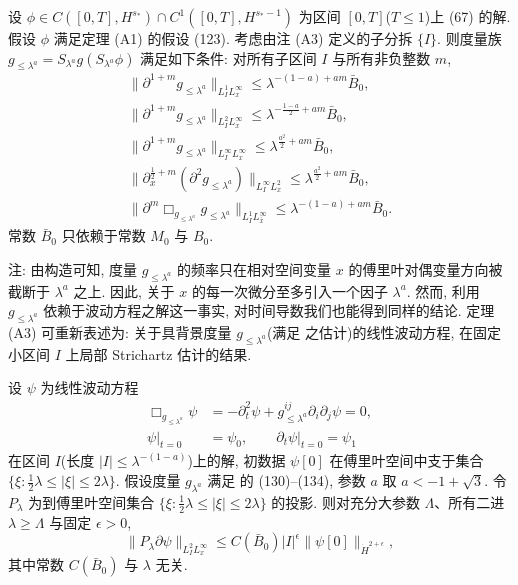 \begin{proposition}\label{prop:6.14}
设 $\phi\in C([0,T],H^{s_*})\cap C^1([0,T],H^{s_*-1})$ 为区间 $[0,T]$($T\leq 1$)上 (67) 的解. 假设 $\phi$ 满足定理 (A1) 的假设 (123). 考虑由注 (A3) 定义的子分拆 $\{I\}$. 则度量族 $g_{\leq\lambda^a}=S_{\lambda^a}g(S_{\lambda^a}\phi)$ 满足如下条件:
对所有子区间 $I$ 与所有非负整数 $m$,
\begin{gather}
\|\partial^{1+m}g_{\leq\lambda^a}\|_{L_I^1L_x^\infty}\leq\lambda^{-(1-a)+am}\bar B_0,\\
\|\partial^{1+m}g_{\leq\lambda^a}\|_{L_I^2L_x^\infty}\leq\lambda^{-\frac{1-a}{2}+am}\bar B_0,\\
\|\partial^{1+m}g_{\leq\lambda^a}\|_{L_I^\infty L_x^\infty}\leq\lambda^{\frac{a^2}{2}+am}\bar B_0,\\
\|\partial_x^{\frac12+m}(\partial^2 g_{\leq\lambda^a})\|_{L_I^\infty L_x^2}\leq\lambda^{\frac{a^2}{2}+am}\bar B_0,\\
\|\partial^m\Box_{g_{\leq\lambda^a}}g_{\leq\lambda^a}\|_{L_I^1L_{\bar x}^\infty}\leq\lambda^{-(1-a)+am}\bar B_0.\end{gather}
常数 $\bar B_0$ 只依赖于常数 $M_0$ 与 $B_0$.\end{proposition}

注: 由构造可知, 度量 $g_{\leq\lambda^a}$ 的频率只在相对空间变量 $x$ 的傅里叶对偶变量方向被截断于 $\lambda^a$ 之上. 因此, 关于 $x$ 的每一次微分至多引入一个因子 $\lambda^a$. 然而, 利用 $g_{\leq\lambda^a}$ 依赖于波动方程之解这一事实, 对时间导数我们也能得到同样的结论.
定理 (A3) 可重新表述为: 关于具背景度量 $g_{\leq\lambda^a}$(满足 之估计)的线性波动方程, 在固定小区间 $I$ 上局部 Strichartz 估计的结果.
\begin{theorem}[A4]\label{thm:6.15}
设 $\psi$ 为线性波动方程
\begin{equation}
\begin{aligned}
\Box_{g_{\leq\lambda^a}}\psi&=-\partial_t^2\psi+g_{\leq\lambda^a}^{ij}\partial_i\partial_j\psi=0,\\
\psi|_{t=0}&=\psi_0,\qquad \partial_t\psi|_{t=0}=\psi_1
\end{aligned}
\end{equation}
在区间 $I$(长度 $|I|\leq\lambda^{-(1-a)}$)上的解, 初数据 $\psi[0]$ 在傅里叶空间中支于集合 $\{\xi:\frac12\lambda\leq|\xi|\leq 2\lambda\}$. 假设度量 $g_{\lambda^a}$ 满足 的 (130)--(134), 参数 $a$ 取 $a<-1+\sqrt3$. 令 $P_\lambda$ 为到傅里叶空间集合 $\{\xi:\frac12\lambda\leq|\xi|\leq 2\lambda\}$ 的投影. 则对充分大参数 $\Lambda$、所有二进 $\lambda\geq\Lambda$ 与固定 $\epsilon>0$,
\begin{equation}
\|P_\lambda\partial\psi\|_{L_I^2L_x^\infty}\leq C(\bar B_0)|I|^\epsilon\|\psi[0]\|_{\dot H^{2+\epsilon}},\end{equation}
其中常数 $C(\bar B_0)$ 与 $\lambda$ 无关.\end{theorem}

